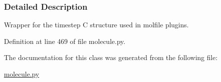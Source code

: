\subsubsection{Detailed Description}
Wrapper for the timestep C structure used in molfile plugins. 



Definition at line 469 of file molecule.\-py.



The documentation for this class was generated from the following file\-:\begin{DoxyCompactItemize}
\item 
\hyperlink{molecule_8py}{molecule.\-py}\end{DoxyCompactItemize}
